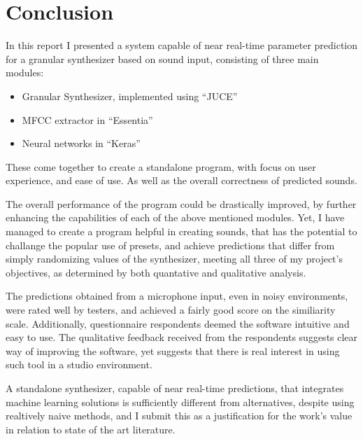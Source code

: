 \chapter{Conclusion}
\label{chapterlabel6}

In this report I presented a system capable of near real-time
parameter prediction for a granular synthesizer based on sound input,
consisting of three main modules:

\begin{itemize}
\item Granular Synthesizer, implemented using ``JUCE''
\item MFCC extractor in ``Essentia''
\item Neural networks in ``Keras''
\end{itemize}

These come together to create a standalone program, with focus on user
experience, and ease of use. As well as the overall correctness of
predicted sounds.

The overall performance of the program could be drastically improved,
by further enhancing the capabilities of each of the above mentioned
modules. Yet, I have managed to create a program helpful in creating
sounds, that has the potential to challange the popular use of
presets, and achieve predictions that differ from simply randomizing
values of the synthesizer, meeting all three of my project's
objectives, as determined by both quantative and qualitative analysis.

The predictions obtained from a microphone input, even in noisy
environments, were rated well by testers, and achieved a fairly good
score on the similiarity scale. Additionally, questionnaire
respondents deemed the software intuitive and easy to use. The
qualitative feedback received from the respondents suggests clear way
of improving the software, yet suggests that there is real interest in
using such tool in a studio environment.

A standalone synthesizer, capable of near real-time predictions, that
integrates machine learning solutions is sufficiently different from
alternatives, despite using realtively naive methods, and I submit
this as a justification for the work's value in relation to state of
the art literature.

